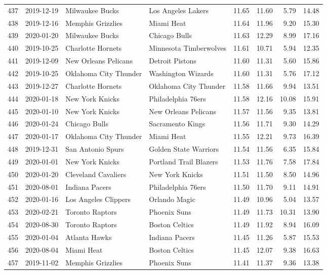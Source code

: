 \documentclass[
  11pt,
]{article}
\theoremstyle{nonumberplain}
\begin{document}
\begin{longtable}{rl|llr|rrr}
437 & 2019-12-19 & Milwaukee Bucks & Los Angeles Lakers & 11.65 & 11.60 & 5.79 & 14.48\\
438 & 2019-12-16 & Memphis Grizzlies & Miami Heat & 11.64 & 11.96 & 9.20 & 15.30\\
439 & 2020-01-20 & Milwaukee Bucks & Chicago Bulls & 11.63 & 12.29 & 8.99 & 17.16\\
440 & 2019-10-25 & Charlotte Hornets & Minnesota Timberwolves & 11.61 & 10.71 & 5.94 & 12.35\\
441 & 2019-12-09 & New Orleans Pelicans & Detroit Pistons & 11.60 & 11.31 & 5.60 & 15.86\\
442 & 2019-10-25 & Oklahoma City Thunder & Washington Wizards & 11.60 & 11.31 & 5.76 & 17.12\\
443 & 2019-12-27 & Charlotte Hornets & Oklahoma City Thunder & 11.58 & 11.66 & 9.94 & 13.51\\
444 & 2020-01-18 & New York Knicks & Philadelphia 76ers & 11.58 & 12.16 & 10.08 & 15.91\\
445 & 2020-01-10 & New York Knicks & New Orleans Pelicans & 11.57 & 11.56 & 9.35 & 13.81\\
446 & 2020-01-24 & Chicago Bulls & Sacramento Kings & 11.56 & 11.71 & 9.30 & 14.29\\
447 & 2020-01-17 & Oklahoma City Thunder & Miami Heat & 11.55 & 12.21 & 9.73 & 16.39\\
448 & 2019-12-31 & San Antonio Spurs & Golden State Warriors & 11.54 & 11.56 & 6.35 & 15.84\\
449 & 2020-01-01 & New York Knicks & Portland Trail Blazers & 11.53 & 11.76 & 7.58 & 17.84\\
450 & 2020-01-20 & Cleveland Cavaliers & New York Knicks & 11.51 & 11.50 & 8.50 & 14.96\\
451 & 2020-08-01 & Indiana Pacers & Philadelphia 76ers & 11.50 & 11.70 & 9.11 & 14.91\\
452 & 2020-01-16 & Los Angeles Clippers & Orlando Magic & 11.49 & 10.96 & 5.04 & 13.57\\
453 & 2020-02-21 & Toronto Raptors & Phoenix Suns & 11.49 & 11.73 & 10.31 & 13.90\\
454 & 2020-08-30 & Toronto Raptors & Boston Celtics & 11.49 & 11.92 & 8.94 & 16.09\\
455 & 2020-01-04 & Atlanta Hawks & Indiana Pacers & 11.45 & 11.26 & 5.87 & 15.53\\
456 & 2020-08-04 & Miami Heat & Boston Celtics & 11.45 & 12.07 & 9.38 & 16.63\\
457 & 2019-11-02 & Memphis Grizzlies & Phoenix Suns & 11.41 & 11.37 & 9.36 & 13.38\\

\end{longtable}
\end{document}
